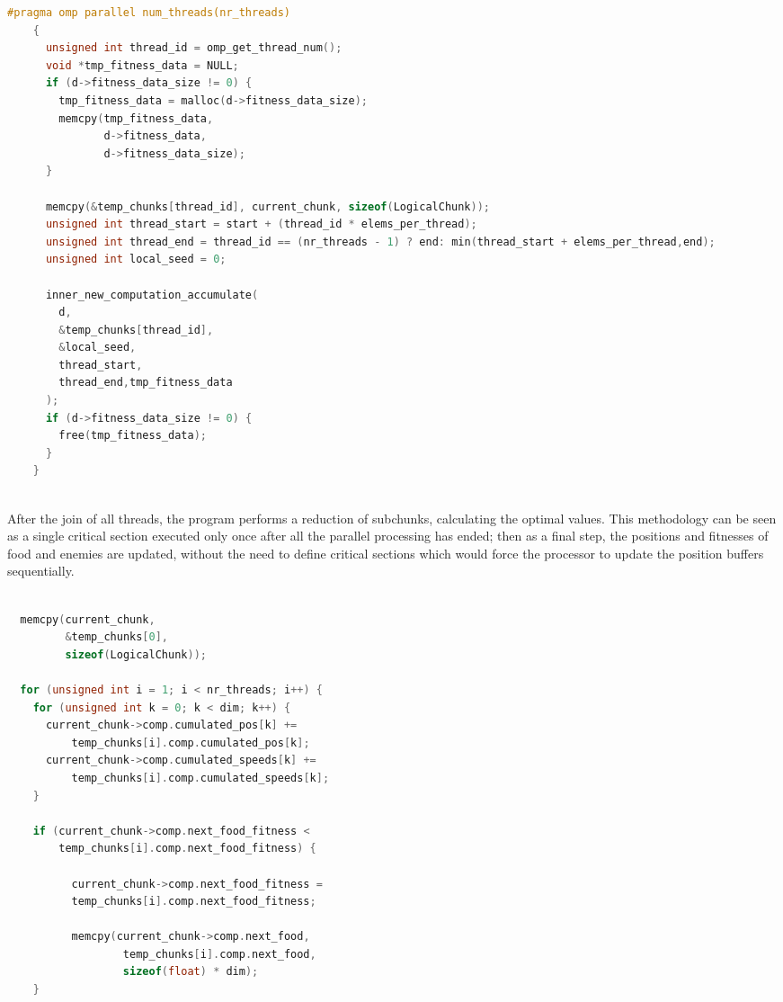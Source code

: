 \documentclass[10pt]{article}
\begin{document}
\begin{multicols}{2}
\begin{lstlisting}[language=C,caption={the parallel version of \textit{computation\_accumulate}}]
  #pragma omp parallel num_threads(nr_threads)
    {
      unsigned int thread_id = omp_get_thread_num();
      void *tmp_fitness_data = NULL;
      if (d->fitness_data_size != 0) {
        tmp_fitness_data = malloc(d->fitness_data_size);
        memcpy(tmp_fitness_data, 
               d->fitness_data, 
               d->fitness_data_size);
      }

      memcpy(&temp_chunks[thread_id], current_chunk, sizeof(LogicalChunk));
      unsigned int thread_start = start + (thread_id * elems_per_thread);
      unsigned int thread_end = thread_id == (nr_threads - 1) ? end: min(thread_start + elems_per_thread,end);
      unsigned int local_seed = 0;
      
      inner_new_computation_accumulate(
        d,
        &temp_chunks[thread_id],
        &local_seed,
        thread_start, 
        thread_end,tmp_fitness_data
      );
      if (d->fitness_data_size != 0) {
        free(tmp_fitness_data);
      }
    }
  
 \end{lstlisting}
 After the join of all threads, the program performs a reduction of subchunks, calculating
the optimal values. This methodology can be seen as a single critical section
executed only once after all the parallel processing has ended; then as a final step, the positions and fitnesses
of food and enemies are updated, without the need to define critical sections which would force the processor 
to update the position buffers sequentially.

\begin{lstlisting}[language=C,caption={the parallel version of \textit{computation\_accumulate}}]

  memcpy(current_chunk, 
         &temp_chunks[0], 
         sizeof(LogicalChunk));

  for (unsigned int i = 1; i < nr_threads; i++) {
    for (unsigned int k = 0; k < dim; k++) {
      current_chunk->comp.cumulated_pos[k] +=
          temp_chunks[i].comp.cumulated_pos[k];
      current_chunk->comp.cumulated_speeds[k] +=
          temp_chunks[i].comp.cumulated_speeds[k];
    }

    if (current_chunk->comp.next_food_fitness <
        temp_chunks[i].comp.next_food_fitness) {

          current_chunk->comp.next_food_fitness =
          temp_chunks[i].comp.next_food_fitness;

          memcpy(current_chunk->comp.next_food, 
                  temp_chunks[i].comp.next_food,
                  sizeof(float) * dim);
    }


\end{lstlisting}
\end{multicols}
\end{document}
